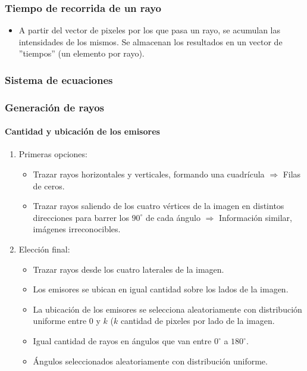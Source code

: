 \documentclass[11pt]{beamer}
\begin{document}
\begin{frame}
\frametitle{Tiempo de recorrida de un rayo}
\begin{itemize}
\item A partir del vector de pixeles por los que pasa un rayo, se acumulan las intensidades de los mismos. Se almacenan los resultados en un vector de ''tiempos'' (un elemento por rayo).
\end{itemize}
\end{frame}

\begin{frame}
\frametitle{Sistema de ecuaciones}
\end{frame}







\begin{frame}
\frametitle{Generación de rayos}
\framesubtitle{Cantidad y ubicación de los emisores}

\begin{enumerate}
    \item Primeras opciones:
    \begin{itemize}
        \item Trazar rayos horizontales y verticales, formando una cuadrícula $\Rightarrow$ Filas de ceros.
        \item Trazar rayos saliendo de los cuatro vértices de la imagen en distintos direcciones para barrer los $90^{\circ}$ de cada ángulo $\Rightarrow$ Información similar, imágenes irreconocibles.
    \end{itemize}
    \item Elección final:
    \begin{itemize}
        
    \item Trazar rayos desde los cuatro laterales de la imagen.
    \item Los emisores se ubican en igual cantidad sobre los lados de la imagen.
    \item La ubicación de los emisores se selecciona aleatoriamente con distribución uniforme entre $0$ y $k$ ($k$ cantidad de pixeles por lado de la imagen.
    \item Igual cantidad de rayos en ángulos que van entre $0^{\circ}$ a $180^{\circ}$.
    \item Ángulos seleccionados aleatoriamente con distribución uniforme.
    \end{itemize}

\end{enumerate}

\end{frame}
\end{document}
